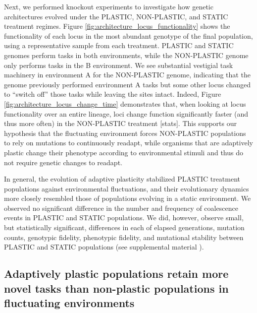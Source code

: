 Next, we performed knockout experiments to investigate how genetic architectures evolved under the PLASTIC, NON-PLASTIC, and STATIC treatment regimes.
Figure \ref{fig:architecture_locus_functionality} shows the functionality of each locus in the most abundant genotype of the final population, using a representative sample from each treatment. 
PLASTIC and STATIC genomes perform tasks in both environments, while the NON-PLASTIC genome only performs tasks in the B environment.
We see substantial vestigial task machinery in environment A for the NON-PLASTIC genome, indicating that the genome previously performed environment A tasks but some other locus changed to ``switch off'' those tasks while leaving the sites intact.  
Indeed, Figure \ref{fig:architecture_locus_change_time} demonstrates that, when looking at locus functionality over an entire lineage, loci change function significantly faster (and thus more often) in the NON-PLASTIC treatment [stats].
This supports our hypothesis that the fluctuating environment forces NON-PLASTIC populations to rely on mutations to continuously readapt, while organisms that are adaptively plastic change their phenotype according to environmental stimuli and thus do not require genetic changes to readapt. 


In general, the evolution of adaptive plasticity stabilized PLASTIC treatment populations against environmental fluctuations, and their evolutionary dynamics more closely resembled those of populations evolving in a static environment.
We observed no significant difference in the number and frequency of coalescence events in PLASTIC and STATIC populations.
We did, however, observe small, but statistically significant, differences in each of elapsed generations, mutation counts, genotypic fidelity, phenotypic fidelity, and mutational stability between PLASTIC and STATIC populations (see supplemental material \citealt{supplemental_material}).

\vspace{0.5cm}
\subsection{Adaptively plastic populations retain more novel tasks than non-plastic populations in fluctuating environments}

